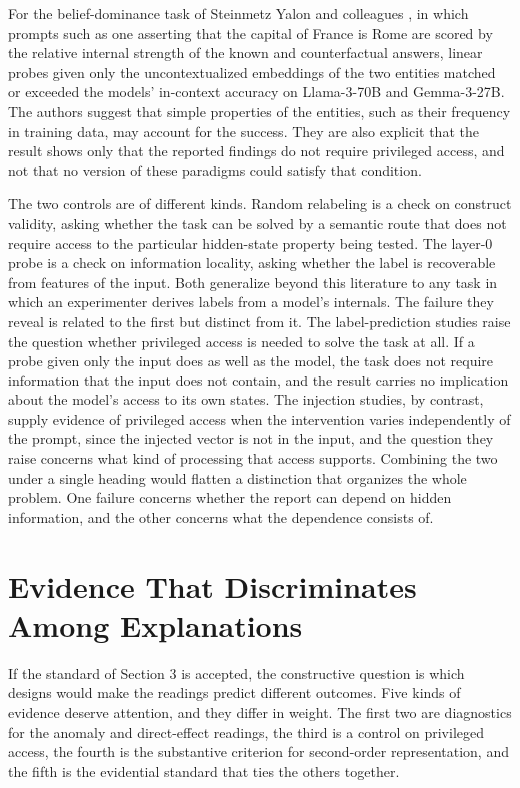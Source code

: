 \documentclass[11pt]{article}
\theoremstyle{definition}
\theoremstyle{remark}
\begin{document}
For the belief-dominance task of Steinmetz Yalon and colleagues \citeyearpar{steinmetz2026}, in which prompts such as one asserting that the capital of France is Rome are scored by the relative internal strength of the known and counterfactual answers, linear probes given only the uncontextualized embeddings of the two entities matched or exceeded the models' in-context accuracy on Llama-3-70B and Gemma-3-27B. The authors suggest that simple properties of the entities, such as their frequency in training data, may account for the success. They are also explicit that the result shows only that the reported findings do not require privileged access, and not that no version of these paradigms could satisfy that condition.

The two controls are of different kinds. Random relabeling is a check on construct validity, asking whether the task can be solved by a semantic route that does not require access to the particular hidden-state property being tested. The layer-0 probe is a check on information locality, asking whether the label is recoverable from features of the input. Both generalize beyond this literature to any task in which an experimenter derives labels from a model's internals. The failure they reveal is related to the first but distinct from it. The label-prediction studies raise the question whether privileged access is needed to solve the task at all. If a probe given only the input does as well as the model, the task does not require information that the input does not contain, and the result carries no implication about the model's access to its own states. The injection studies, by contrast, supply evidence of privileged access when the intervention varies independently of the prompt, since the injected vector is not in the input, and the question they raise concerns what kind of processing that access supports. Combining the two under a single heading would flatten a distinction that organizes the whole problem. One failure concerns whether the report can depend on hidden information, and the other concerns what the dependence consists of.

\section{Evidence That Discriminates Among Explanations}

If the standard of Section 3 is accepted, the constructive question is which designs would make the readings predict different outcomes. Five kinds of evidence deserve attention, and they differ in weight. The first two are diagnostics for the anomaly and direct-effect readings, the third is a control on privileged access, the fourth is the substantive criterion for second-order representation, and the fifth is the evidential standard that ties the others together.
\end{document}

